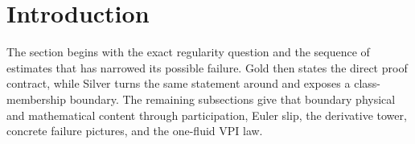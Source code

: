 
\section{Introduction}\label{sec:Introduction}

The section begins with the exact regularity question and the sequence of estimates that has narrowed its possible failure.
Gold then states the direct proof contract, while Silver turns the same statement around and exposes a class-membership boundary.
The remaining subsections give that boundary physical and mathematical content through participation, Euler slip, the derivative tower, concrete failure pictures, and the one-fluid VPI law.










